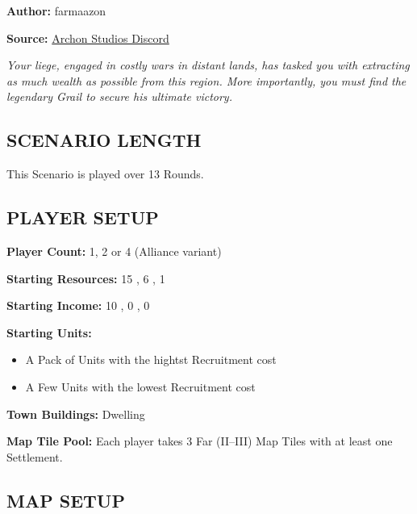 
\begin{multicols}{2}

\textbf{Author:} farmaazon

\textbf{Source:} \href{https://discordapp.com/channels/740870068178649108/1344400556717768865/1344400556717768865}{Archon Studios Discord}

\textit{Your liege, engaged in costly wars in distant lands, has tasked you with extracting as much wealth as possible from this region. More importantly, you must find the legendary Grail to secure his ultimate victory.}

\subsection*{\MakeUppercase{Scenario Length}}

This Scenario is played over 13 Rounds.

\subsection*{\MakeUppercase{Player Setup}}

\textbf{Player Count:} 1, 2 or 4 (Alliance variant)

\textbf{Starting Resources:} 15 , 6 , 1 

\textbf{Starting Income:} 10 , 0 , 0 

\textbf{Starting Units:}
\begin{itemize}
  \item A Pack of  Units with the hightst Recruitment cost
  \item A Few  Units with the lowest Recruitment cost
\end{itemize}

\textbf{Town Buildings:}  Dwelling

\textbf{Map Tile Pool:} Each player takes 3 Far (II--III) Map Tiles with at least one Settlement.

\subsection*{\MakeUppercase{Map Setup}}


\end{multicols}
